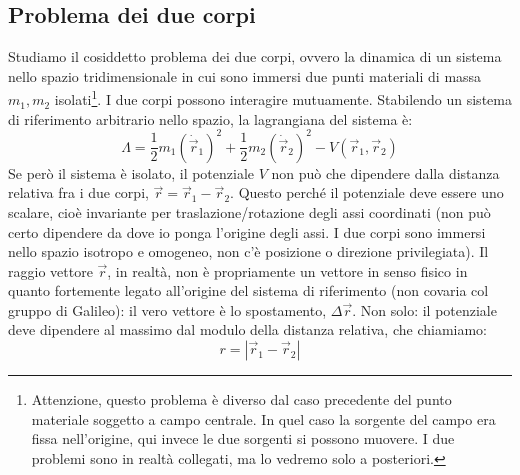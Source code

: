 \documentclass[a4paper,openany]{article}
\begin{document}
	\subsection{Problema dei due corpi}
	Studiamo il cosiddetto problema dei due corpi, ovvero la dinamica di un sistema nello spazio tridimensionale in cui sono immersi due punti materiali di massa $m_1, m_2$ isolati\footnote{Attenzione, questo problema è diverso dal caso precedente del punto materiale soggetto a campo centrale. In quel caso la sorgente del campo era fissa nell'origine, qui invece le due sorgenti si possono muovere. I due problemi sono in realtà collegati, ma lo vedremo solo a posteriori.}. I due corpi possono interagire mutuamente. Stabilendo un sistema di riferimento arbitrario nello spazio, la lagrangiana del sistema è:
	\begin{equation}\label{key}
		\Lambda=  \dfrac{1}{2}m_1(\dot{\vec{r}}_{1})^{2} + \dfrac{1}{2}m_2(\dot{\vec{r}}_{2})^{2} - V(\vec{r}_1,\vec{r}_2)
	\end{equation}
	Se però il sistema è isolato, il potenziale $V$ non può che dipendere dalla distanza relativa fra i due corpi, $ \vec{r} = \vec{r}_1-\vec{r}_2 $. Questo perché il potenziale deve essere uno scalare, cioè invariante per traslazione/rotazione degli assi coordinati (non può certo dipendere da dove io ponga l'origine degli assi. I due corpi sono immersi nello spazio isotropo e omogeneo, non c'è posizione o direzione privilegiata). Il raggio vettore $\vec{r}$, in realtà, non è propriamente un vettore in senso fisico in quanto fortemente legato all'origine del sistema di riferimento (non covaria col gruppo di Galileo): il vero vettore è lo spostamento, $\Delta \vec{r}$. Non solo: il potenziale deve dipendere al massimo dal modulo della distanza relativa, che chiamiamo:
	$$
	r = |\vec{r}_1-\vec{r}_2|
	$$
	
\end{document}
